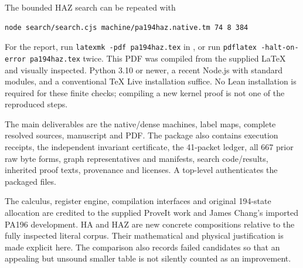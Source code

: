 \documentclass[11pt]{article}
\begin{document}
The bounded HAZ search can be repeated with
\begin{verbatim}
node search/search.cjs machine/pa194haz.native.tm 74 8 384
\end{verbatim}
For the report, run \texttt{latexmk -pdf pa194haz.tex} in , or
run \texttt{pdflatex -halt-on-error pa194haz.tex} twice. This PDF was compiled
from the supplied LaTeX and visually inspected. Python 3.10 or newer,
a recent Node.js with standard modules, and a conventional TeX Live
installation suffice. No Lean installation is required for these finite
checks; compiling a new kernel proof is not one of the reproduced steps.

The main deliverables are the native/dense machines, label maps, complete
resolved sources, manuscript and PDF. The package also contains execution
receipts, the independent invariant certificate, the 41-packet ledger,
all 667 prior raw byte forms, graph representatives and manifests, search
code/results, inherited proof texts, provenance and licenses. A top-level
 authenticates the packaged files.

The calculus, register engine, compilation interfaces and original 194-state
allocation are credited to the supplied ProveIt work and James Chang's
imported PA196 development. HA and HAZ are new concrete compositions
relative to the fully inspected literal corpus. Their mathematical and
physical justification is made explicit here. The comparison also records
failed candidates so that an appealing but unsound smaller table is not
silently counted as an improvement.
\end{document}
